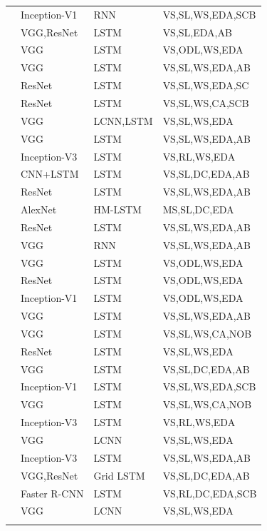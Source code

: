 \begin{longtable}{ p{} p{} p{} p{}}
    \citet{You2016} & Inception-V1 & RNN & VS,SL,WS,EDA,SCB\\
    \citet{Chen2017_SCA} & VGG,ResNet & LSTM & VS,SL,EDA,AB\\
    \citet{Dai2017_CGAN} & VGG & LSTM & VS,ODL,WS,EDA\\
    \citet{Fu2017} & VGG & LSTM & VS,SL,WS,EDA,AB\\
    \citet{Gan2017_Style} & ResNet & LSTM & VS,SL,WS,EDA,SC\\
    \citet{Gan2017_SCN} & ResNet & LSTM & VS,SL,WS,CA,SCB\\
    \citet{Gu2017} & VGG & LCNN,LSTM & VS,SL,WS,EDA\\
    \citet{Liu2017_SAM} & VGG & LSTM & VS,SL,WS,EDA,AB\\
    \citet{Liu2017_PG} & Inception-V3 & LSTM & VS,RL,WS,EDA\\
    \citet{Liu2017_MAT} & CNN+LSTM & LSTM & VS,SL,DC,EDA,AB\\
    \citet{Lu2017} & ResNet & LSTM & VS,SL,WS,EDA,AB\\
    \citet{Niu2017} & AlexNet & HM-LSTM & MS,SL,DC,EDA\\
    \citet{Park2017} & ResNet & LSTM & VS,SL,WS,EDA,AB\\
    \citet{Pedersoli2017} & VGG & RNN & VS,SL,WS,EDA,AB\\
    \citet{Ren2017} & VGG & LSTM & VS,ODL,WS,EDA\\
    \citet{Rennie2017} & ResNet & LSTM & VS,ODL,WS,EDA\\
    \citet{Shetty2017} & Inception-V1 & LSTM & VS,ODL,WS,EDA\\
    \citet{Tavakoliy2017} & VGG & LSTM & VS,SL,WS,EDA,AB\\
    \citet{Venugopalan2017} & VGG & LSTM & VS,SL,WS,CA,NOB\\
    \citet{Wang2017} & ResNet & LSTM & VS,SL,WS,EDA\\
    \citet{Yang2017} & VGG & LSTM & VS,SL,DC,EDA,AB\\
    \citet{Yao2017_Attr} & Inception-V1 & LSTM & VS,SL,WS,EDA,SCB\\
    \citet{Yao2017_NOB} & VGG & LSTM & VS,SL,WS,CA,NOB\\
    \citet{Zhang2017} & Inception-V3 & LSTM & VS,RL,WS,EDA\\
    \citet{Aneja2018} & VGG & LCNN & VS,SL,WS,EDA\\
    \citet{Jiang2018} & Inception-V3 & LSTM & VS,SL,WS,EDA,AB\\
    \citet{Khademi2018} & VGG,ResNet & Grid LSTM & VS,SL,DC,EDA,AB\\
    \citet{Li2018_VS-LSTM} & Faster R-CNN & LSTM & VS,RL,DC,EDA,SCB\\
    \citet{Wang2018} & VGG & LCNN & VS,SL,WS,EDA\\
    \bottomrule
\label{tab:classification}
\end{longtable}

